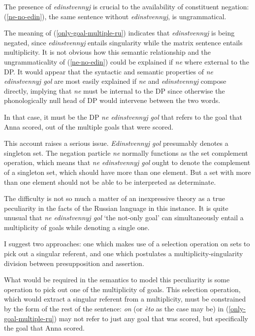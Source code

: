 The presence of \textit{edinstvennyj} is crucial to the availability of constituent negation: (\ref{ne-no-edin}), the same sentence without \textit{edinstvennyj}, is ungrammatical.

\begin{exe}
\end{exe}

The meaning of (\ref{only-goal-multiple-ru}) indicates that \textit{edinstvennyj} is being negated, since \textit{edinstvennyj} entails singularity while the matrix sentence entails multiplicity. It is not obvious how this semantic relationship and the ungrammaticality of (\ref{ne-no-edin}) could be explained if \textit{ne} where external to the DP. It would appear that the syntactic and semantic properties of \textit{ne edinstvennyj gol} are most easily explained if \textit{ne} and \textit{edinstvennyj} compose directly, implying that \textit{ne} must be internal to the DP since otherwise the phonologically null head of DP would intervene between the two words.

In that case, it must be the DP \textit{ne edinstvennyj gol} that refers to the goal that Anna scored, out of the multiple goals that were scored.

This account raises a serious issue. \textit{Edinstvennyj gol} presumably denotes a singleton set. The negation particle \textit{ne} normally functions as the set complement operation, which means that \textit{ne edinstvennyj gol} ought to denote the complement of a singleton set, which should have more than one element. But a set with more than one element should not be able to be interpreted as determinate.

The difficulty is not so much a matter of an inexpressive theory as a true peculiarity in the facts of the Russian language in this instance. It is quite unusual that \textit{ne edinstvennyj gol} `the not-only goal' can simultaneously entail a multiplicity of goals while denoting a single one.

I suggest two approaches: one which makes use of a selection operation on sets to pick out a singular referent, and one which postulates a multiplicity-singularity division between presupposition and assertion.

What would be required in the semantics to model this peculiarity is some operation to pick out one of the multiplicity of goals. This selection operation, which would extract a singular referent from a multiplicity, must be constrained by the form of the rest of the sentence: \textit{on} (or \textit{\`{e}to}  as the case may be) in (\ref{only-goal-multiple-ru}) may not refer to just any goal that was scored, but specifically the goal that Anna scored.

